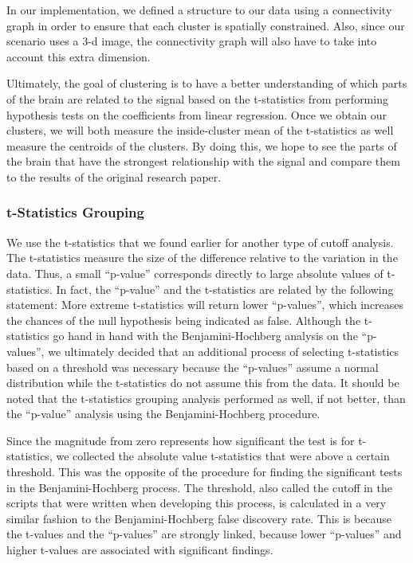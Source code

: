 In our implementation, we defined a structure to our data using a connectivity
graph in order to ensure that each cluster is spatially constrained. Also,
since our scenario uses a 3-d image, the connectivity graph will also have to
take into account this extra dimension.


\par Ultimately, the goal of clustering is to have a better understanding of 
which parts of the brain are related to the signal based on the t-statistics 
from performing hypothesis tests on the coefficients from linear regression.
Once we obtain our clusters, we will both measure the inside-cluster mean of
the t-statistics as well measure the centroids of the clusters. By doing this,
we hope to see the parts of the brain that have the strongest relationship with
the signal and compare them to the results of the original research paper.

\subsubsection{t-Statistics Grouping}

\par We use the t-statistics that we found earlier for another type of cutoff
analysis. The t-statistics measure the size of the difference relative to the 
variation in the data. Thus, a small ``p-value'' corresponds directly to large
absolute values of t-statistics. In fact, the ``p-value'' and the t-statistics
are related by the following statement: More extreme t-statistics will return 
lower ``p-values'', which increases the chances of the null hypothesis being 
indicated as false. Although the t-statistics go hand in hand with the 
Benjamini-Hochberg analysis on the ``p-values'', we ultimately decided that an 
additional process of selecting t-statistics based on a threshold was 
necessary because the ``p-values'' assume a normal distribution while the 
t-statistics do not assume this from the data. It should be noted that the 
t-statistics grouping analysis performed as well, if not better, than the 
``p-value'' analysis using the Benjamini-Hochberg procedure.

\par Since the magnitude from zero represents how significant the test is for
t-statistics, we collected the absolute value t-statistics that were above a 
certain threshold. This was the opposite of the procedure for finding the 
significant tests in the Benjamini-Hochberg process. The threshold, also called
the cutoff in the scripts that were written when developing this process, is 
calculated in a very similar fashion to the Benjamini-Hochberg false discovery 
rate. This is because the t-values and the ``p-values'' are strongly linked,
because lower ``p-values'' and higher t-values are associated with significant 
findings. 

